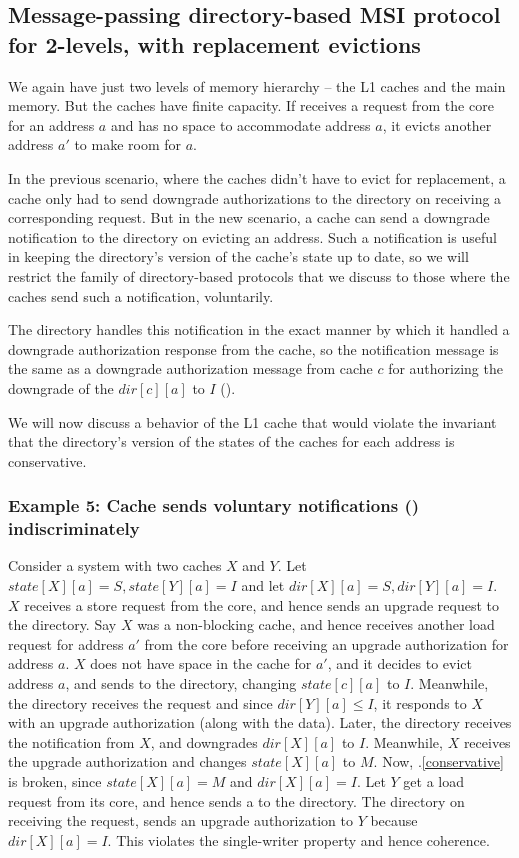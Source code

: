 \subsection{Message-passing directory-based MSI protocol for 2-levels, with
replacement evictions}
We again have just two levels of memory hierarchy -- the L1 caches and the main
memory. But the caches have finite capacity. If receives a request from the core
for an address $a$ and has no space to accommodate address $a$, it evicts
another address $a'$ to make room for $a$.

In the previous scenario, where the caches didn't have to evict for replacement,
a cache only had to send downgrade authorizations to the directory on receiving
a corresponding request. But in the new scenario, a cache can send a downgrade
notification to the directory on evicting an address. Such a notification is
useful in keeping the directory's version of the cache's state up to date, so we
will restrict the family of directory-based protocols that we discuss to those
where the caches send such a notification, voluntarily.

The directory handles this notification in the exact manner by which it handled
a downgrade authorization response from the cache, so the notification message
is the same as a downgrade authorization message from cache $c$ for authorizing
the downgrade of the $dir[c][a]$ to $I$ ().

We will now discuss a behavior of the L1 cache that would violate the
invariant that the directory's version of the states of the caches for each
address is conservative.

\subsubsection*{Example 5: Cache sends voluntary notifications
() indiscriminately}
Consider a system with two caches $X$ and $Y$. Let $state[X][a] = S, state[Y][a]
= I$ and let $dir[X][a] = S, dir[Y][a] = I$. $X$ receives a store request from
the core, and hence sends an upgrade request  to the
directory. Say $X$ was a non-blocking cache, and hence receives another load
request for address $a'$ from the core before receiving an upgrade authorization
for address $a$. $X$ does not have space in the cache for $a'$, and it decides
to evict address $a$, and sends  to the directory, changing
$state[c][a]$ to $I$.  Meanwhile, the directory receives the request
 and since $dir[Y][a] \le I$, it responds to $X$ with an
upgrade authorization  (along with the data). Later, the
directory receives the notification  from $X$, and downgrades
$dir[X][a]$ to $I$. Meanwhile, $X$ receives the upgrade authorization
 and changes $state[X][a]$ to $M$. Now,
\FirstInv.\ref{conservative} is broken, since $state[X][a] = M$ and $dir[X][a] =
I$. Let $Y$ get a load request from its core, and hence sends a
 to the directory. The directory on receiving the request,
sends an upgrade authorization to $Y$ because $dir[X][a] = I$. This violates the
single-writer property and hence coherence.
